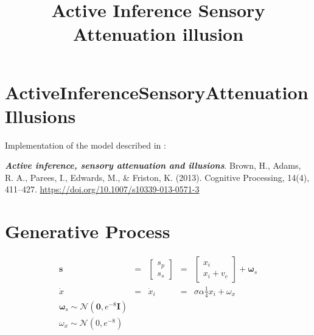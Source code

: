 \documentclass[11pt]{article}
\title{Active Inference Sensory Attenuation illusion}
\begin{document}
\maketitle

\section{ActiveInferenceSensoryAttenuationIllusions}
\label{activeinferencesensoryattenuationillusions}

Implementation of the model described in :

\textbf{\emph{Active inference, sensory attenuation and
illusions}}.  Brown, H., Adams, R. A., Parees, I., Edwards,
M., \& Friston, K. (2013).  Cognitive Processing, 14(4),
411--427.  \url{https://doi.org/10.1007/s10339-013-0571-3}

\section*{Generative Process}

$$
\begin{array}{lllll}
    \mathbf{s} &=& \left[ \begin{array}{c} s_p \\ s_s \end{array} \right] &=&
    \left[ \begin{array}{c} x_i \\
    x_i + v_e \end{array} \right] + \bm{\omega}_s \\
    \dot{x} &=& \dot{x}_i &=& \sigma{\alpha} \frac{1}{4} x_i + \omega_x\\
    \bm{\omega}_s \sim \mathcal{N}(\mathbf{0}, e ^ {-8} \mathbf{I})\\
    \omega_x \sim \mathcal{N}(0, e ^ {-8})
\end{array}
$$
\end{document}
